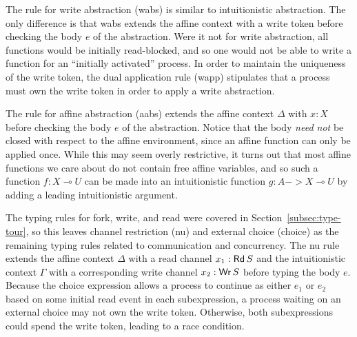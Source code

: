 The rule for write abstraction (wabs) is similar to intuitionistic
abstraction. The only difference is that wabs extends the affine context with a
write token before checking the body $e$ of the abstraction. Were it not for
write abstraction, all functions would be initially read-blocked, and so one
would not be able to write a function for an ``initially activated'' process. In
order to maintain the uniqueness of the write token, the dual application rule
(wapp) stipulates that a process must own the write token in order to apply a
write abstraction.

The rule for affine abstraction (aabs) extends the affine context $\Delta$ with $x :
X$ before checking the body $e$ of the abstraction. Notice that the
body \emph{need not} be closed with respect to the affine environment, since an
affine function can only be applied once. While this may seem overly
restrictive, it turns out that most affine functions we care about do not
contain free affine variables, and so such a function $f : X \multimap U$ can be made
into an intuitionistic function $g : A -> X \multimap U$ by adding a leading
intuitionistic argument.

The typing rules for fork, write, and read were covered in
Section~\ref{subsec:type-tour}, so this leaves channel restriction (nu) and
external choice (choice) as the remaining typing rules related to communication
and concurrency. The nu rule extends the affine context $\Delta$ with a read channel
$x_1 : \textnormal{\textsf{Rd}}\,S$ and the intuitionistic context $\Gamma$ with a corresponding write
channel $x_2 : \textnormal{\textsf{Wr}}\,S$ before typing the body $e$. Because the choice
expression allows a process to continue as either $e_1$ or $e_2$ based on some
initial read event in each subexpression, a process waiting on an external
choice may not own the write token. Otherwise, both subexpressions could spend
the write token, leading to a race condition.


